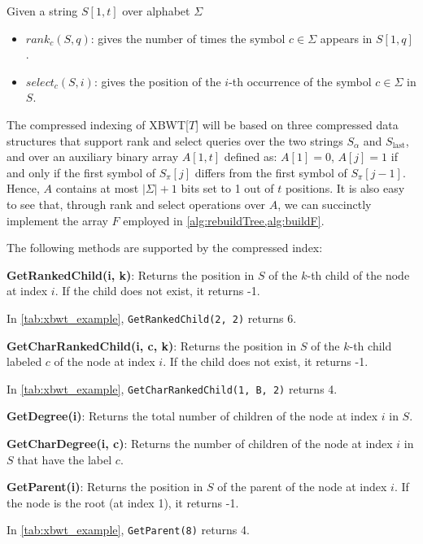 Given a string $S[1, t]$ over alphabet $\Sigma$
\begin{itemize}
    \item \textbf{$rank_c(S, q)$}: gives the number of times the symbol $c \in \Sigma$ appears in $S[1, q]$.
    \item \textbf{$select_c(S, i)$}: gives the position of the $i$-th occurrence of the symbol $c \in \Sigma$ in $S$.
\end{itemize}

The compressed indexing of XBWT[$T$] will be based on three compressed data structures that support rank and select queries over the two strings $S_{\alpha}$ and $S_{\text{last}}$, and over an auxiliary binary array $A[1, t]$ defined as: $A[1] = 0$, $A[j] = 1$ if and only if the first symbol of $S_{\pi}[j]$ differs from the first symbol of $S_{\pi}[j - 1]$. 
Hence, $A$ contains at most $|\Sigma| + 1$ bits set to 1 out of $t$ positions. It is also easy to see that, through rank and select operations over $A$, we can succinctly implement the array $F$ employed in \cref{alg:rebuildTree,alg:buildF}.

The following methods are supported by the compressed index:

\textbf{GetRankedChild(i, k)}: Returns the position in $S$ of the $k$-th child of the node at index $i$. If the child does not exist, it returns -1. 
\begin{example}
    In \cref{tab:xbwt_example}, \texttt{GetRankedChild(2, 2)} returns 6.
\end{example}

\textbf{GetCharRankedChild(i, c, k)}: Returns the position in $S$ of the $k$-th child labeled $c$ of the node at index $i$. If the child does not exist, it returns -1.
\begin{example}
    In \cref{tab:xbwt_example}, \texttt{GetCharRankedChild(1, B, 2)} returns 4.
\end{example}

\textbf{GetDegree(i)}: Returns the total number of children of the node at index $i$ in $S$.

\textbf{GetCharDegree(i, c)}: Returns the number of children of the node at index $i$ in $S$ that have the label $c$.

\textbf{GetParent(i)}: Returns the position in $S$ of the parent of the node at index $i$. If the node is the root (at index 1), it returns -1.
\begin{example}
    In \cref{tab:xbwt_example}, \texttt{GetParent(8)} returns 4.
\end{example}

